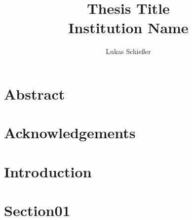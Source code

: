 \documentclass[12pt,twoside]{report}
\title{
{Thesis Title}\\
{\large Institution Name}\\
}
\author{Lukas Schießer}
\date{}
\begin{document}
\maketitle
\chapter*{Abstract}

\chapter*{Acknowledgements}
 
\tableofcontents
\listoffigures
\listoftables
\newpage
\chapter{Introduction}

\chapter{Section01}

\end{document}
